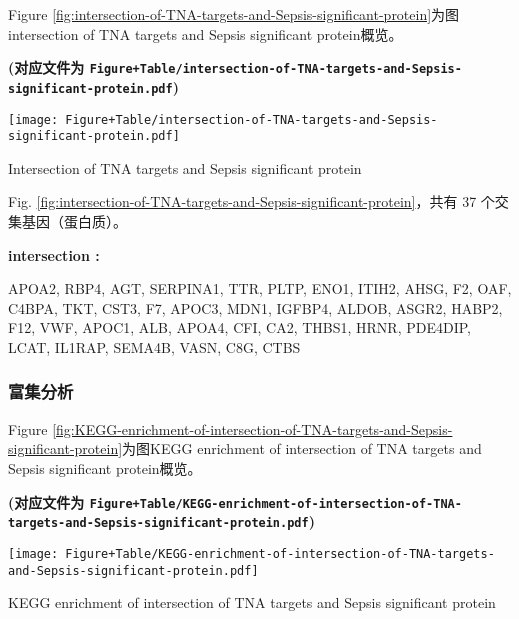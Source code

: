 \documentclass[
]{article}
\begin{document}
Figure \ref{fig:intersection-of-TNA-targets-and-Sepsis-significant-protein}为图intersection of TNA targets and Sepsis significant protein概览。

\textbf{(对应文件为 \texttt{Figure+Table/intersection-of-TNA-targets-and-Sepsis-significant-protein.pdf})}

\def\@captype{figure}
\begin{center}
\texttt{[image: Figure+Table/intersection-of-TNA-targets-and-Sepsis-significant-protein.pdf]}
\caption{Intersection of TNA targets and Sepsis significant protein}\label{fig:intersection-of-TNA-targets-and-Sepsis-significant-protein}
\end{center}

Fig. \ref{fig:intersection-of-TNA-targets-and-Sepsis-significant-protein}，共有 37 个交集基因（蛋白质）。

\begin{center}\begin{tcolorbox}[colback=gray!10, colframe=gray!50, width=0.9\linewidth, arc=1mm, boxrule=0.5pt]
\textbf{
intersection
:}

\vspace{0.5em}

    APOA2, RBP4, AGT, SERPINA1, TTR, PLTP, ENO1, ITIH2,
AHSG, F2, OAF, C4BPA, TKT, CST3, F7, APOC3, MDN1, IGFBP4,
ALDOB, ASGR2, HABP2, F12, VWF, APOC1, ALB, APOA4, CFI, CA2,
THBS1, HRNR, PDE4DIP, LCAT, IL1RAP, SEMA4B, VASN, C8G, CTBS

\vspace{2em}
\end{tcolorbox}
\end{center}

\hypertarget{ux5bccux96c6ux5206ux6790-1}{%
\subsubsection{富集分析}\label{ux5bccux96c6ux5206ux6790-1}}

Figure \ref{fig:KEGG-enrichment-of-intersection-of-TNA-targets-and-Sepsis-significant-protein}为图KEGG enrichment of intersection of TNA targets and Sepsis significant protein概览。

\textbf{(对应文件为 \texttt{Figure+Table/KEGG-enrichment-of-intersection-of-TNA-targets-and-Sepsis-significant-protein.pdf})}

\def\@captype{figure}
\begin{center}
\texttt{[image: Figure+Table/KEGG-enrichment-of-intersection-of-TNA-targets-and-Sepsis-significant-protein.pdf]}
\caption{KEGG enrichment of intersection of TNA targets and Sepsis significant protein}\label{fig:KEGG-enrichment-of-intersection-of-TNA-targets-and-Sepsis-significant-protein}
\end{center}
\end{document}
